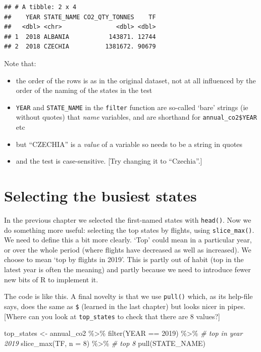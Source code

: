 \documentclass[
]{book}
\newenvironment{Shaded}{\begin{snugshade}}{\end{snugshade}}
\newcommand{\AttributeTok}[1]{\textcolor[rgb]{0.77,0.63,0.00}{#1}}
\newcommand{\CommentTok}[1]{\textcolor[rgb]{0.56,0.35,0.01}{\textit{#1}}}
\newcommand{\DecValTok}[1]{\textcolor[rgb]{0.00,0.00,0.81}{#1}}
\newcommand{\FunctionTok}[1]{\textcolor[rgb]{0.00,0.00,0.00}{#1}}
\newcommand{\NormalTok}[1]{#1}
\newcommand{\OtherTok}[1]{\textcolor[rgb]{0.56,0.35,0.01}{#1}}
\newcommand{\SpecialCharTok}[1]{\textcolor[rgb]{0.00,0.00,0.00}{#1}}
\providecommand{\tightlist}{%
  \setlength{\itemsep}{0pt}\setlength{\parskip}{0pt}}
\begin{document}
\begin{verbatim}
## # A tibble: 2 x 4
##    YEAR STATE_NAME CO2_QTY_TONNES    TF
##   <dbl> <chr>               <dbl> <dbl>
## 1  2018 ALBANIA           143871. 12744
## 2  2018 CZECHIA          1381672. 90679
\end{verbatim}

Note that:

\begin{itemize}
\tightlist
\item
  the order of the rows is as in the original dataset, not at all influenced by the order of the naming of the states in the test
\item
  \texttt{YEAR} and \texttt{STATE\_NAME} in the \texttt{filter} function are so-called `bare' strings (ie without quotes) that \emph{name} variables, and are shorthand for \texttt{annual\_co2\$YEAR} etc
\item
  but ``CZECHIA'' is a \emph{value} of a variable so needs to be a string in quotes
\item
  and the test is case-sensitive. {[}Try changing it to ``Czechia''.{]}
\end{itemize}

\hypertarget{topStates}{%
\section{Selecting the busiest states}\label{topStates}}

In the previous chapter we selected the first-named states with \texttt{head()}. Now we do something more useful: selecting the top states by flights, using \texttt{slice\_max()}. We need to define this a bit more clearly. `Top' could mean in a particular year, or over the whole period (where flights have decreased as well as increased). We choose to mean `top by flights in 2019'. This is partly out of habit (top in the latest year is often the meaning) and partly because we need to introduce fewer new bits of R to implement it.

The code is like this. A final novelty is that we use \texttt{pull()} which, as its help-file says, does the same as \texttt{\$} (learned in the last chapter) but looks nicer in pipes. {[}Where can you look at \texttt{top\_states} to check that there are 8 values?{]}

\begin{Shaded}
\begin{Highlighting}[]
\NormalTok{top\_states }\OtherTok{\textless{}{-}}\NormalTok{ annual\_co2 }\SpecialCharTok{\%\textgreater{}\%}
  \FunctionTok{filter}\NormalTok{(YEAR }\SpecialCharTok{==} \DecValTok{2019}\NormalTok{) }\SpecialCharTok{\%\textgreater{}\%}     \CommentTok{\# top in year 2019}
  \FunctionTok{slice\_max}\NormalTok{(TF, }\AttributeTok{n =} \DecValTok{8}\NormalTok{) }\SpecialCharTok{\%\textgreater{}\%}  \CommentTok{\# top 8 }
  \FunctionTok{pull}\NormalTok{(STATE\_NAME) }
\end{Highlighting}
\end{Shaded}
\end{document}
